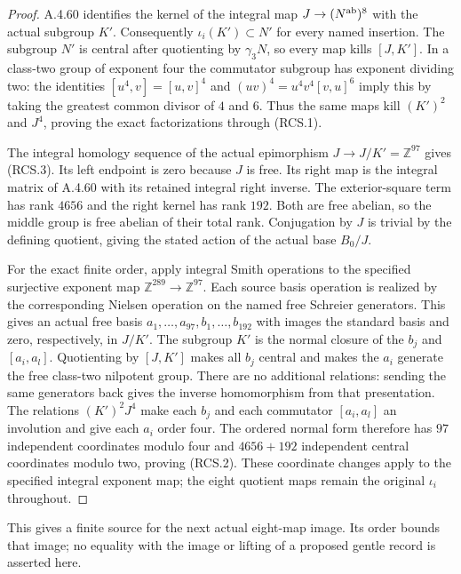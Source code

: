 \begin{proof}
A.4.60 identifies the kernel of the integral map
$J\to(N^{\rm ab})^8$ with the actual subgroup $K'$.
Consequently $\iota_i(K')\subset N'$ for every named insertion.
The subgroup $N'$ is central after quotienting by $\gamma_3N$,
so every map kills $[J,K']$.
In a class-two group of exponent four the commutator subgroup
has exponent dividing two: the identities
$[u^4,v]=[u,v]^4$ and
$(uv)^4=u^4v^4[v,u]^6$ imply this by taking the greatest common
divisor of $4$ and $6$.
Thus the same maps kill $(K')^2$ and $J^4$, proving the exact
factorizations through (RCS.1).

The integral homology sequence of the actual epimorphism
$J\to J/K'=\mathbb Z^{97}$ gives (RCS.3).
Its left endpoint is zero because $J$ is free.  Its right map
is the integral matrix of A.4.60 with its retained integral
right inverse.  The exterior-square term has rank $4656$ and
the right kernel has rank $192$.
Both are free abelian, so the middle group is free abelian of
their total rank.  Conjugation by $J$ is trivial by the defining
quotient, giving the stated action of the actual base $B_0/J$.

For the exact finite order, apply integral Smith operations to
the specified surjective exponent map
$\mathbb Z^{289}\to\mathbb Z^{97}$.
Each source basis operation is realized by the corresponding
Nielsen operation on the named free Schreier generators.
This gives an actual free basis
$a_1,\ldots,a_{97},b_1,\ldots,b_{192}$ with images the standard
basis and zero, respectively, in $J/K'$.
The subgroup $K'$ is the normal closure of the $b_j$ and
$[a_i,a_l]$.  Quotienting by $[J,K']$ makes all $b_j$ central
and makes the $a_i$ generate the free class-two nilpotent group.
There are no additional relations: sending the same generators
back gives the inverse homomorphism from that presentation.
The relations $(K')^2J^4$ make each $b_j$ and each commutator
$[a_i,a_l]$ an involution and give each $a_i$ order four.
The ordered normal form therefore has $97$ independent
coordinates modulo four and $4656+192$ independent central
coordinates modulo two, proving (RCS.2).
These coordinate changes apply to the specified integral
exponent map; the eight quotient maps remain the original
$\iota_i$ throughout.
\end{proof}

This gives a finite source for the next actual eight-map image.
Its order bounds that image; no equality with the image or
lifting of a proposed gentle record is asserted here.
